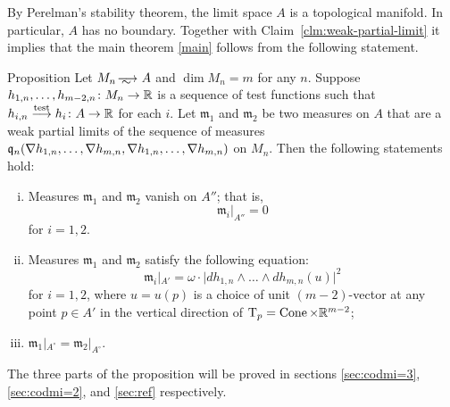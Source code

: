 By Perelman's stability theorem, the limit space $A$ is a topological manifold.
In particular, $A$ has no boundary.
Together with Claim~\ref{clm:weak-partial-limit} it implies that the main theorem \ref{main} follows from the following statement.

\begin{thm}{Proposition}\label{prop:3parts}
Let $M_n\smooths{} A$ and $\dim M_n=m$ for any $n$.
Suppose $h_{1,n},\dots, h_{m-2,n}\colon M_n\to\mathbb{R}$ is a sequence of test functions
such that $h_{i,n}\zz\testto  h_i\:A\to \RR$ for each $i$.
Let $\mathfrak m_1$ and $\mathfrak m_2$ be two measures on $A$ that are a weak partial limits of the sequence of measures $\mathfrak{q}_n(\nabla h_{1,n},\zz\dots, \nabla h_{m,n},\nabla h_{1,n},\zz\dots, \nabla h_{m,n})$ on $M_n$.
Then the following statements hold:
\begin{enumerate}[(i)]
\item\label{prop:3parts:codim3} Measures $\mathfrak m_1$ and $\mathfrak m_2$ vanish on $A''$; that is, 
\[\mathfrak m_i|_{A''}=0\]
for $i=1,2$.

\item\label{prop:3parts:codim2} Measures $\mathfrak m_1$ and $\mathfrak m_2$ satisfy the following equation:
\[\mathfrak m_i|_{A'}=\omega\cdot |d h_{1,n}\wedge\dots\wedge d h_{m,n}(u)|^2\]
for $i=1,2$,
where $u=u(p)$ is a choice of unit $(m-2)$-vector at any point $p\in A'$ in the vertical direction of $\mathrm{T}_p=\operatorname{Cone}\times \mathbb{R}^{m-2}$;

\item\label{prop:3parts:reg} $\mathfrak m_1|_{A^\circ}=\mathfrak m_2|_{A^\circ}$.
\end{enumerate}
\end{thm}

The three parts of the proposition will be proved in sections \ref{sec:codmi=3}, \ref{sec:codmi=2}, and \ref{sec:ref} respectively.

